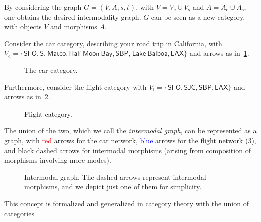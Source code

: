 By considering the graph $G=(V,A,s,t)$, with $V=V_\mathrm{c}\cup V_\mathrm{s}$ and $A=A_\mathrm{c}\cup A_\mathrm{s}$, one obtains the desired intermodality graph. $G$ can be seen as a new category, with objects $V$ and morphisms $A$.
\begin{example}
Consider the car category, describing your road trip in California, with $V_\mathrm{c}=\{\mathsf{SFO},\mathsf{S.}\ \mathsf{Mateo},\mathsf{Half} \ \mathsf{Moon}\ \mathsf{Bay},\mathsf{SBP},\mathsf{Lake}\ \mathsf{Balboa},\mathsf{LAX}\}$ and arrows as in~\cref{fig:carcat}.

\begin{figure}[h!]
\begin{center}
\end{center}
\caption{The car category. \label{fig:carcat}}
\end{figure}

Furthermore, consider the flight category with $V_\mathrm{f}=\{\mathsf{SFO},\mathsf{SJC},\mathsf{SBP},\mathsf{LAX}\}$ and arrows as in~\cref{fig:subcat}.


\begin{figure}[h!]
\begin{center}
\end{center}
\caption{Flight category. \label{fig:subcat}}
\end{figure}
The union of the two, which we call the \emph{intermodal graph}, can be represented as a graph, with \textcolor{red}{red} arrows for the car network, \textcolor{blue}{blue} arrows for the flight network (\cref{fig:intermodal}), and black dashed arrows for intermodal morphisms (arising from composition of morphisms involving more modes).

\begin{figure}[h!]
\begin{center}
\end{center}
\caption{Intermodal graph. The dashed arrows represent intermodal morphisms, and we depict just one of them for simplicity. \label{fig:intermodal}}
\end{figure}
\end{example}


\noindent This concept is formalized and generalized in category theory with the union of categories

